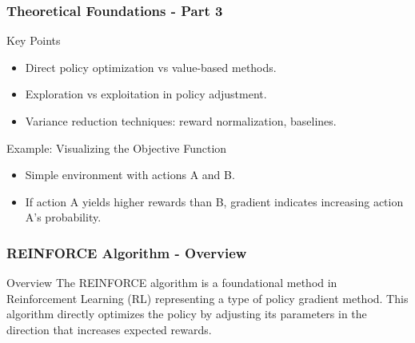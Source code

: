 \documentclass[aspectratio=169]{beamer}
\begin{document}
\begin{frame}[fragile]
    \frametitle{Theoretical Foundations - Part 3}
    \begin{block}{Key Points}
        \begin{itemize}
            \item Direct policy optimization vs value-based methods.
            \item Exploration vs exploitation in policy adjustment.
            \item Variance reduction techniques: reward normalization, baselines.
        \end{itemize}
    \end{block}

    \begin{block}{Example: Visualizing the Objective Function}
        \begin{itemize}
            \item Simple environment with actions A and B.
            \item If action A yields higher rewards than B, gradient indicates increasing action A's probability.
        \end{itemize}
    \end{block}
\end{frame}

\begin{frame}[fragile]
    \frametitle{REINFORCE Algorithm - Overview}
    \begin{block}{Overview}
        The REINFORCE algorithm is a foundational method in Reinforcement Learning (RL) 
        representing a type of policy gradient method. This algorithm directly optimizes the policy 
        by adjusting its parameters in the direction that increases expected rewards.
    \end{block}
\end{frame}
\end{document}
